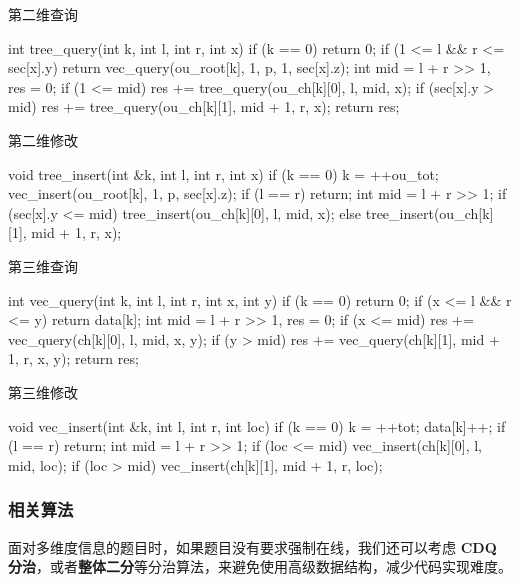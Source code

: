 第二维查询

\begin{cppcode}
int tree_query(int k, int l, int r, int x) {
  if (k == 0) return 0;
  if (1 <= l && r <= sec[x].y) return vec_query(ou_root[k], 1, p, 1, sec[x].z);
  int mid = l + r >> 1, res = 0;
  if (1 <= mid) res += tree_query(ou_ch[k][0], l, mid, x);
  if (sec[x].y > mid) res += tree_query(ou_ch[k][1], mid + 1, r, x);
  return res;
}
\end{cppcode}

第二维修改

\begin{cppcode}
void tree_insert(int &k, int l, int r, int x) {
  if (k == 0) k = ++ou_tot;
  vec_insert(ou_root[k], 1, p, sec[x].z);
  if (l == r) return;
  int mid = l + r >> 1;
  if (sec[x].y <= mid)
    tree_insert(ou_ch[k][0], l, mid, x);
  else
    tree_insert(ou_ch[k][1], mid + 1, r, x);
}
\end{cppcode}

第三维查询

\begin{cppcode}
int vec_query(int k, int l, int r, int x, int y) {
  if (k == 0) return 0;
  if (x <= l && r <= y) return data[k];
  int mid = l + r >> 1, res = 0;
  if (x <= mid) res += vec_query(ch[k][0], l, mid, x, y);
  if (y > mid) res += vec_query(ch[k][1], mid + 1, r, x, y);
  return res;
}
\end{cppcode}

第三维修改

\begin{cppcode}
void vec_insert(int &k, int l, int r, int loc) {
  if (k == 0) k = ++tot;
  data[k]++;
  if (l == r) return;
  int mid = l + r >> 1;
  if (loc <= mid) vec_insert(ch[k][0], l, mid, loc);
  if (loc > mid) vec_insert(ch[k][1], mid + 1, r, loc);
}
\end{cppcode}

\subsubsection{相关算法}

面对多维度信息的题目时，如果题目没有要求强制在线，我们还可以考虑 \textbf{CDQ 分治}，或者\textbf{整体二分}等分治算法，来避免使用高级数据结构，减少代码实现难度。
